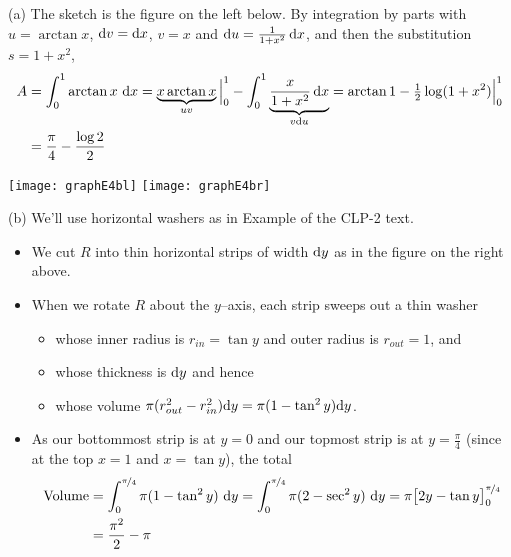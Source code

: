 \begin{solution} (a) The sketch is the figure on  the left below.
By integration by parts with $u=\arctan x$, $\mathrm{d}v=\mathrm{d}x$,  $v=x$ and $\mathrm{d}u=\frac{1}{1+x^2}\,\mathrm{d}x$, and then the substitution $s=1+x^2$,
\begin{align*}
A&=\int_0^1\arctan x\ \mathrm{d}x=\underbrace{ x\arctan x}_{uv}\Big|_0^1-\int_0^1\underbrace{\frac{x}{1+x^2}\,\mathrm{d}x}_{v\mathrm{d}u}
=\arctan 1-\tfrac{1}{2}\log(1+x^2)\Big|_0^1\\
&=\frac{\pi}{4}-\frac{\log 2}{2}
\end{align*}

\begin{center}
       \texttt{[image: graphE4bl]}\qquad
       \texttt{[image: graphE4br]}
\end{center}

\noindent (b)
We'll use horizontal washers as in Example  
of the %
CLP-2 text.
 \begin{itemize}
\item We cut $R$ into thin horizontal  strips of width $\mathrm{d}y$ as in
the figure on the right above.

\item When we rotate $R$ about the $y$--axis, each strip sweeps out a thin
washer
\begin{itemize}
\item whose inner radius is $r_{in}=\tan y$ and outer radius is $r_{out}=1$, and
\item whose thickness is $\mathrm{d}y$ and hence
\item whose volume $\pi(r_{out}^2 - r_{in}^2)\mathrm{d}y = \pi(1-\tan^2 y)\mathrm{d}y$.
\end{itemize}
\item As our bottommost strip is at $y=0$ and our topmost
strip is at $y=\frac{\pi}{4}$ (since at the top $x=1$ and $x=\tan y$), the total
\begin{align*}
\text{Volume}
&= \int _0^{\nicefrac{\pi}{4}} \pi(1-\tan^2 y)\ \mathrm{d}y
= \int _0^{\nicefrac{\pi}{4}} \pi(2-\sec^2 y)\ \mathrm{d}y
=\pi\big[2y -\tan y\big]_0^{\nicefrac{\pi}{4}} \\
&= \frac{\pi^2}{2}-\pi
\end{align*}
\end{itemize}
\end{solution}


